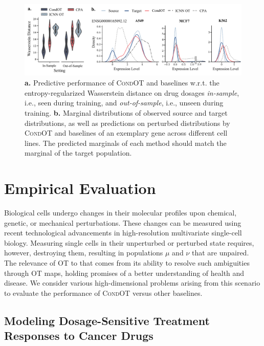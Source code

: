 \begin{figure}
    \centering
    \includegraphics[width=\textwidth]{figures/fig_sciplex_main_results.pdf}
    \caption{\textbf{a.}  Predictive performance of \textsc{CondOT} and baselines w.r.t. the entropy-regularized Wasserstein distance on drug dosages \emph{in-sample}, i.e., seen during training, and \emph{out-of-sample}, i.e., unseen during training. \textbf{b.} Marginal distributions of observed source and target distributions, as well as predictions on perturbed distributions by \textsc{CondOT} and baselines of an exemplary gene across different cell lines. The predicted marginals of each method should match the marginal of the target population.}
    \label{fig:exp_scalar_sciplex}
\end{figure}

\section{Empirical Evaluation} \label{sec:evaluation_condot}

 Biological cells undergo changes in their molecular profiles upon chemical, genetic, or mechanical perturbations. These changes can be measured using recent technological advancements in high-resolution multivariate single-cell biology. Measuring single cells in their unperturbed or perturbed state requires, however, destroying them, resulting in populations $\mu$ and $\nu$ that are unpaired. The relevance of OT to that comes from its ability to resolve such ambiguities through OT maps, 
holding promises of a better understanding of health and disease. 
We consider various high-dimensional problems arising from this scenario to evaluate the performance of \textsc{CondOT} versus other baselines.

\subsection{Modeling Dosage-Sensitive Treatment Responses to Cancer Drugs} \label{sec:eval_scalar}

